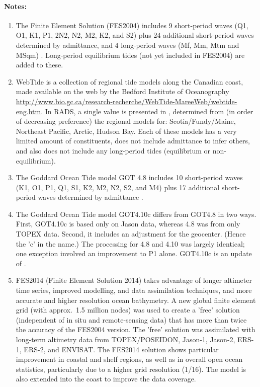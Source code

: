 \documentclass[a4paper,11pt,openany,natbib,nomargin]{thesis}
\newenvironment{notes}[1][Notes:]{\FloatBarrier\paragraph{#1}\begin{enumerate}}{\end{enumerate}}
\begin{document}
\begin{notes}
\item The Finite Element Solution (FES2004) includes 9 short-period waves (Q1, O1, K1, P1, 2N2, N2, M2, K2, and S2) plus 24 additional short-period waves determined by admittance, and 4 long-period waves (Mf, Mm, Mtm and MSqm) \citep{lyard2006}. Long-period equilibrium tides (not yet included in FES2004) are added to these.\label{item:tide_ocean_fes04}\label{item:tide_load_fes04}
\item WebTide is a collection of regional tide models along the Canadian coast, made available on the web by the Bedford Institute of Oceanography \url{http://www.bio.gc.ca/research-recherche/WebTide-MareeWeb/webtide-eng.htm}. In RADS, a single value is presented in , determined from (in order of decreasing preference) the regional models for: Scotia/Fundy/Maine, Northeast Pacific, Arctic, Hudson Bay. Each of these models has a very limited amount of constituents, does not include admittance to infer others, and also does not include any long-period tides (equilibrium or non-equilibrium).\label{item:tide_ocean_webtide}
\item The Goddard Ocean Tide model GOT 4.8 includes 10 short-period waves (K1, O1, P1, Q1, S1, K2, M2, N2, S2, and M4) plus 17 additional short-period waves determined by admittance \citep{ray2011}.\label{item:tide_ocean_got48}\label{item:tide_load_got48}
\item The Goddard Ocean Tide model GOT4.10c differs from GOT4.8 in two ways. First, GOT4.10c is based only on Jason data, whereas 4.8 was from only TOPEX data. Second, it includes an adjustment for the geocenter. (Hence the 'c' in the name.) The processing for 4.8 and 4.10 was largely identical; one exception involved an improvement to P1 alone. GOT4.10c is an update of \citet{ray2013}.\label{item:tide_ocean_got410}\label{item:tide_load_got410}
\item FES2014 (Finite Element Solution 2014) takes advantage of longer altimeter time series, improved modelling, and data assimilation techniques, and more accurate and higher resolution ocean bathymetry. A new global finite element grid (with approx.\ 1.5 million nodes) was used to create a 'free' solution (independent of in situ and remote-sensing data) that has more than twice the accuracy of the FES2004 version. The 'free' solution was assimilated with long-term altimetry data from TOPEX/POSEIDON, Jason-1, Jason-2, ERS-1, ERS-2, and ENVISAT. The FES2014 solution shows particular improvement in coastal and shelf regions, as well as in overall open ocean statistics, particularly due to a higher grid resolution (1/16\deg{}). The model is also extended into the coast to improve the data coverage.

\end{notes}
\end{document}
